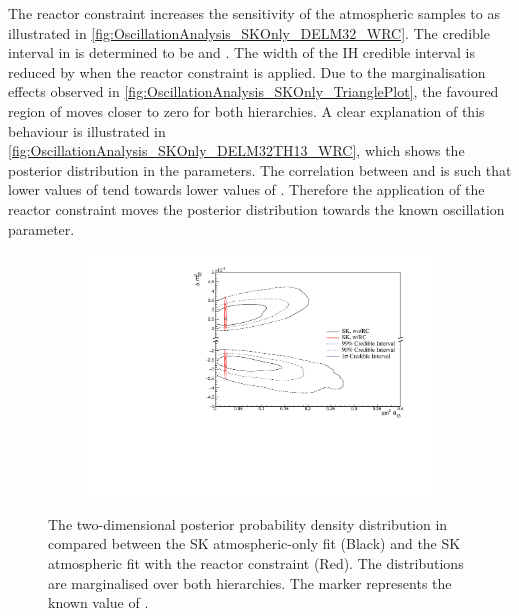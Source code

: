 The reactor constraint increases the sensitivity of the atmospheric samples to  as illustrated in \autoref{fig:OscillationAnalysis_SKOnly_DELM32_WRC}. The \quickmath{1\sigma} credible interval in  is determined to be  and . The width of the IH credible interval is reduced by  when the reactor constraint is applied. Due to the marginalisation effects observed in \autoref{fig:OscillationAnalysis_SKOnly_TrianglePlot}, the favoured region of  moves closer to zero for both hierarchies. A clear explanation of this behaviour is illustrated in \autoref{fig:OscillationAnalysis_SKOnly_DELM32TH13_WRC}, which shows the posterior distribution in the  parameters. The correlation between  and  is such that lower values of  tend towards lower values of . Therefore the application of the reactor constraint moves the posterior distribution towards the known oscillation parameter.

\begin{figure}[h]
  \begin{subfigure}[t]{0.98\textwidth}
    \includegraphics[width=\textwidth, trim={0mm 0mm 0mm 0mm}, clip,page=1]{Figures/OA/SKOnlyFit_wRC/ContourComparison_2D_th13_dm32_BH_0_wRC_woRC_UnSmeared_CredibleInterval.pdf}
  \end{subfigure}
    \caption{The two-dimensional posterior probability density distribution in  compared between the SK atmospheric-only fit (Black) and the SK atmospheric fit with the reactor constraint (Red). The distributions are marginalised over both hierarchies. The marker represents the known value of .}
  \label{fig:OscillationAnalysis_SKOnly_DELM32TH13_WRC}
\end{figure}

